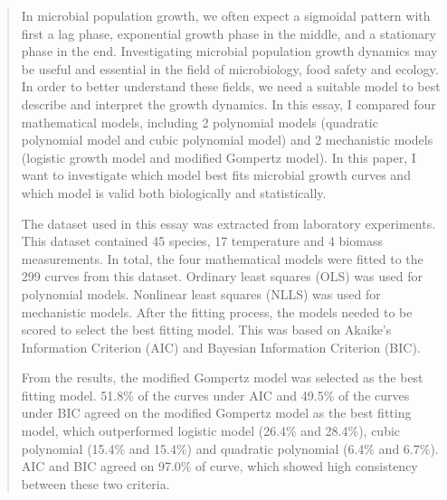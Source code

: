 \documentclass[11pt]{article}
\begin{document}
\begin{abstract}
In microbial population growth, we often expect a sigmoidal pattern with first a lag phase, exponential growth phase in the middle, and a stationary phase in the end. Investigating microbial population growth dynamics may be useful and essential in the field of microbiology, food safety and ecology. In order to better understand these fields, we need a suitable model to best describe and  interpret  the growth dynamics. In this essay, I compared four mathematical models, including 2 polynomial models (quadratic polynomial model and cubic polynomial model) and 2 mechanistic models (logistic growth model and modified Gompertz model). In this paper, I want to investigate which model best fits microbial growth curves and which model is valid both biologically and statistically.

The dataset used in this essay was extracted from laboratory experiments. This dataset contained 45 species, 17 temperature and 4 biomass measurements. In total, the four mathematical models were fitted to the 299 curves from this dataset. Ordinary least squares (OLS) was used for polynomial models. Nonlinear least squares (NLLS) was used for mechanistic models. After the fitting process, the models needed to be scored to select the best fitting model. This was based on Akaike’s Information Criterion (AIC) and Bayesian Information Criterion (BIC).

From the results, the modified Gompertz model was selected as the best fitting model. 51.8\% of the curves under AIC and 49.5\% of the curves under BIC agreed on the modified Gompertz model as the best fitting model, which outperformed logistic model (26.4\% and 28.4\%), cubic polynomial (15.4\% and 15.4\%) and quadratic polynomial (6.4\% and 6.7\%). AIC and BIC agreed on 97.0\% of curve, which showed high consistency between these two criteria.
\end{abstract}
\linenumbers
\end{document}
